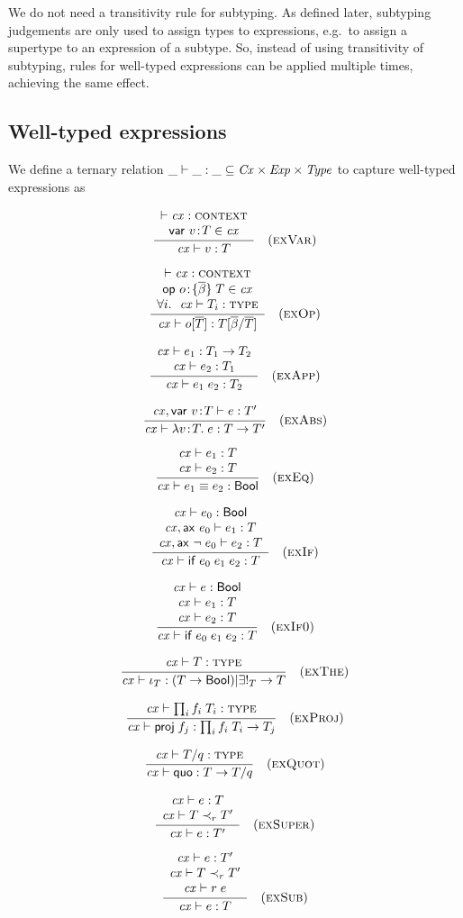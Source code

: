 We do not need a transitivity rule for subtyping. As defined later, subtyping
judgements are only used to assign types to expressions, e.g.\ to assign a
supertype to an expression of a subtype. So, instead of using transitivity of
subtyping, rules for well-typed expressions can be applied multiple times,
achieving the same effect.

\subsection{Well-typed expressions}

We define a ternary relation $\_\vdash\_:\_\subseteq\mathit{Cx}\times\mathit{Exp}\times\mathit{Type}$ to capture
well-typed expressions as

\[
\frac{\begin{array}{c}\vdash\mathit{cx}:\textsc{context}\\\mathsf{var}\ v\!:\!T\in\mathit{cx}\end{array}}{\mathit{cx}\vdash v:T}\quad\mbox{(\textsc{exVar})}
\]

\[
\frac{\begin{array}{c}\vdash\mathit{cx}:\textsc{context}\\\mathsf{op}\ o\!:\!\{\overline{\beta}\}\;T\in\mathit{cx}\\\forall i.\ \ \mathit{cx}\vdash T_i:\textsc{type}\end{array}}{\mathit{cx}\vdash o[\overline{T}]:T[\overline{\beta}/\overline{T}]}\quad\mbox{(\textsc{exOp})}
\]

\[
\frac{\begin{array}{c}\mathit{cx}\vdash e_1:T_1\to T_2\\\mathit{cx}\vdash e_2:T_1\end{array}}{\mathit{cx}\vdash e_1\;e_2:T_2}\quad\mbox{(\textsc{exApp})}
\]

\[
\frac{\begin{array}{c}\mathit{cx},\mathsf{var}\ v\!:\!T\vdash e:T'\end{array}}{\mathit{cx}\vdash\lambda v\!:\!T.\;e:T\to T'}\quad\mbox{(\textsc{exAbs})}
\]

\[
\frac{\begin{array}{c}\mathit{cx}\vdash e_1:T\\\mathit{cx}\vdash e_2:T\end{array}}{\mathit{cx}\vdash e_1\equiv e_2:\mathsf{Bool}}\quad\mbox{(\textsc{exEq})}
\]

\[
\frac{\begin{array}{c}\mathit{cx}\vdash e_0:\mathsf{Bool}\\\mathit{cx},\mathsf{ax}\ e_0\vdash e_1:T\\\mathit{cx},\mathsf{ax}\ \neg\;e_0\vdash e_2:T\end{array}}{\mathit{cx}\vdash\mathsf{if}\;e_0\;e_1\;e_2:T}\quad\mbox{(\textsc{exIf})}
\]

\[
\frac{\begin{array}{c}\mathit{cx}\vdash e:\mathsf{Bool}\\\mathit{cx}\vdash e_1:T\\\mathit{cx}\vdash e_2:T\end{array}}{\mathit{cx}\vdash\mathsf{if}\;e_0\;e_1\;e_2:T}\quad\mbox{(\textsc{exIf0})}
\]

\[
\frac{\begin{array}{c}\mathit{cx}\vdash T:\textsc{type}\end{array}}{\mathit{cx}\vdash\iota_{T}:(T\to\mathsf{Bool})|\exists!_{T}\to T}\quad\mbox{(\textsc{exThe})}
\]

\[
\frac{\begin{array}{c}\mathit{cx}\vdash\prod_{i}f_i\;T_i:\textsc{type}\end{array}}{\mathit{cx}\vdash\mathsf{proj}\;{f_j}:\prod_{i}f_i\;T_i\to T_j}\quad\mbox{(\textsc{exProj})}
\]


\[
\frac{\begin{array}{c}\mathit{cx}\vdash T/q:\textsc{type}\end{array}}{\mathit{cx}\vdash\mathsf{quo}:T\to T/q}\quad\mbox{(\textsc{exQuot})}
\]

\[
\frac{\begin{array}{c}\mathit{cx}\vdash e:T\\\mathit{cx}\vdash T\prec_{r}T'\end{array}}{\mathit{cx}\vdash e:T'}\quad\mbox{(\textsc{exSuper})}
\]

\[
\frac{\begin{array}{c}\mathit{cx}\vdash e:T'\\\mathit{cx}\vdash T\prec_{r}T'\\\mathit{cx}\vdash r\;e\end{array}}{\mathit{cx}\vdash e:T}\quad\mbox{(\textsc{exSub})}
\]

